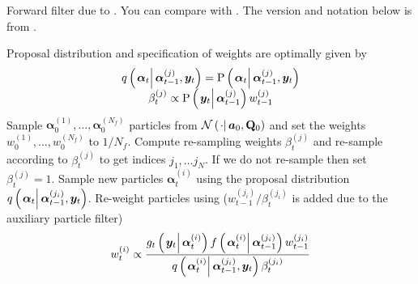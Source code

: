 \documentclass[notitlepage]{article}
\newcommand\StateX{\Statex\hspace{\algorithmicindent}}
\renewcommand{\vec}[1]{\bm{#1}}
\newcommand{\mat}[1]{\mathbf{#1}}
\newcommand{\Lparen}[1]{\left( #1\right)}
\newcommand{\Cond}[2]{\left. #1 \vphantom{#2} \right\vert  #2}
\newcommand{\Prob}{\text{P}}
\newcommand{\optor}[2]{#1\Lparen{#2}}
\newcommand{\optorC}[3]{\optor{#1}{\Cond{#2}{#3}}}
\newcommand{\propC}[2]{\optorC{\Prob}{#1}{#2}}
\newcommand{\gFunc}[3]{\optorC{g_{#3}}{#1}{#2}}
\newcommand{\fFunc}[2]{\optorC{f}{#1}{#2}}
\newcommand{\normalC}[3]{\optorC{\mathcal{N}}{#1}{#2,#3}}
\newcommand{\IDC}[2]{\optorC{q}{#1}{#2}}
\newcommand{\partic}[3]{#1_{#2}^{\Lparen{#3}}}
\newcommand{\nPart}{N}
\newcommand{\nPeriods}{d}
\begin{document}
\begin{algorithm}[H]
\caption{Forward filter due to \cite{pitt99}. You can compare with \citet[page 20 and 25]{doucet09}. The version and notation below is from \citet[page 449]{fearnhead10}.}\label{alg:forward}
\begin{algorithmic}[1]\raggedright
\INPUT
\Statex Proposal distribution and specification of weights are optimally given by
\Statex \begin{equation}\begin{matrix}
	\IDC{\vec{\alpha}_t}{\partic{\vec{\alpha}}{t-1}{j}, \vec{y}_t} = \propC{\vec{\alpha}_t}{\partic{\vec{\alpha}}{t-1}{j}, \vec{y}_t} \\
	\partic{\beta}{t}{j} \propto \propC{\vec{y}_t}{\partic{\vec{\alpha}}{t-1}{j}}\partic{w}{t-1}{j}
\end{matrix}\end{equation}
%
\State Sample $\partic{\vec{\alpha}}{0}{1},\dots,\partic{\vec{\alpha}}{0}{\nPart_f}$ particles from $\normalC{\cdot}{\vec{a}_0}{\mat{Q}_0}$ and set the weights $\partic{w}{0}{1},\dots,\partic{w}{0}{\nPart_f}$ to $1 / \nPart_f$.
%
\For{$t=1,\dots, \nPeriods$}
\State Compute re-sampling weights $\partic{\beta}{t}{j}$ and re-sample according to $\partic{\beta}{t}{j}$ to get indices $j_1,\dots j_\nPart$. If we do not re-sample then set $\partic{\beta}{t}{j} = 1$.
\EndProcedure
%
\State Sample new particles $\partic{\vec{\alpha}}{t}{i}$ using the proposal distribution $\IDC{\vec{\alpha}_t}{\partic{\vec{\alpha}}{t-1}{j_i}, \vec{y}_t}$.
\EndProcedure
%
\State Re-weight particles using ($\partic{w}{t-1}{j_i}/\partic{\beta}{t}{j_i}$ is added due to the auxiliary particle filter)
\StateX \begin{equation}\label{eqn:forwardWeight}
	\partic{w}{t}{i} \propto \frac{
		\gFunc{\vec{y}_t}{\partic{\vec{\alpha}}{t}{i}}{t}
		\fFunc{\partic{\vec{\alpha}}{t}{i}}{\partic{\vec{\alpha}}{t-1}{j_i}}
		\partic{w}{t-1}{j_i}
	}{ %
		\IDC{\partic{\vec{\alpha}}{t}{i}}{\partic{\vec{\alpha}}{t-1}{j_i}, \vec{y}_t}
		\partic{\beta}{t}{j_i}
	}
\end{equation}
\EndProcedure
\EndFor
\end{algorithmic}
\end{algorithm}
\end{document}
